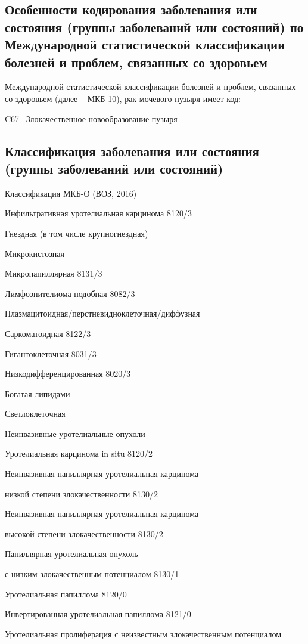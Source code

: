 \subsection{Особенности кодирования заболевания или состояния (группы заболеваний или состояний) по Международной статистической классификации болезней и проблем, связанных со здоровьем
}
\label{sec:}
Международной статистической классификации болезней и проблем, связанных со здоровьем (далее – МКБ-10), рак мочевого пузыря имеет код:

C67– Злокачественное новообразование пузыря

\subsection{Классификация заболевания или состояния (группы заболеваний или состояний)}
\label{sec:}
Классификация МКБ-О (ВОЗ, 2016)

Инфильтративная уротелиальная карцинома 8120/3

Гнездная (в том числе крупногнездная) 

Микрокистозная

Микропапиллярная 8131/3

Лимфоэпителиома-подобная 8082/3

Плазмацитоидная/перстневидноклеточная/диффузная

Саркоматоидная 8122/3

Гигантоклеточная 8031/3

Низкодифференцированная 8020/3

Богатая липидами

Светлоклеточная

Неинвазивные уротелиальные опухоли

Уротелиальная карцинома in situ 8120/2

Неинвазивная папиллярная уротелиальная карцинома

низкой степени злокачественности 8130/2

Неинвазивная папиллярная уротелиальная карцинома

высокой степени злокачественности 8130/2

Папиллярная уротелиальная опухоль

с низким злокачественным потенциалом 8130/1

Уротелиальная папиллома 8120/0

Инвертированная уротелиальная папиллома 8121/0

Уротелиальная пролиферация с неизвестным злокачественным потенциалом

